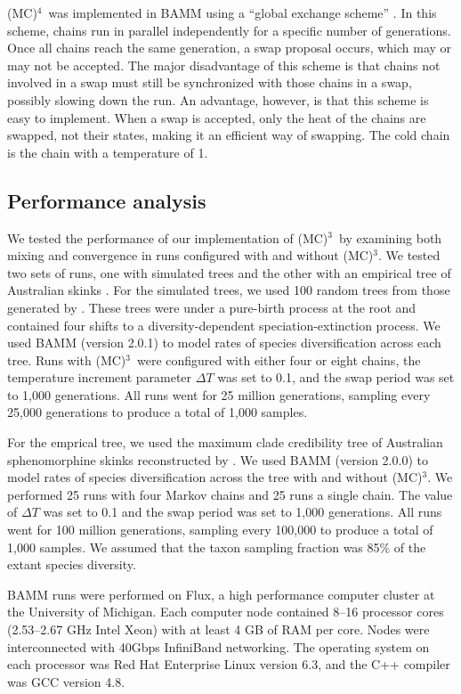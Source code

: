 \documentclass[12pt]{article}
\newcommand{\MCMCMC}{(MC)$^{3}$}
\newcommand{\MCMCMCMC}{(MC)$^{4}$}
\begin{document}
\MCMCMCMC\ was implemented in BAMM
using a ``global exchange scheme'' \citep{alt04}.
%
In this scheme, chains run in parallel independently
for a specific number of generations.
%
Once all chains reach the same generation, a swap proposal occurs,
which may or may not be accepted.
%
The major disadvantage of this scheme
is that chains not involved in a swap
must still be synchronized with those chains in a swap,
possibly slowing down the run.
%
An advantage, however, is that this scheme is easy to implement.
%
When a swap is accepted, only the heat of the chains are swapped,
not their states, making it an efficient way of swapping.
%
The cold chain is the chain with a temperature of 1.


\subsection*{Performance analysis}

We tested the performance of our implementation of \MCMCMC\ 
by examining both mixing and convergence in runs
configured with and without \MCMCMC.
%
We tested two sets of runs, one with simulated trees
and the other with an empirical tree of Australian skinks \citep{rab14sysbio}.
%
For the simulated trees, we used 100 random trees
from those generated by \citet{rab14plos}.
%
These trees were under a pure-birth process at the root and
contained four shifts to a diversity-dependent speciation-extinction process.
%
We used BAMM (version 2.0.1) to model rates of species diversification
across each tree.
%
Runs with \MCMCMC\ were configured with either four or eight chains,
the temperature increment parameter $\Delta T$ was set to 0.1,
and the swap period was set to 1,000 generations.
%
All runs went for 25 million generations,
sampling every 25,000 generations to produce a total of 1,000 samples.


For the emprical tree, we used the maximum clade credibility tree
of Australian sphenomorphine skinks reconstructed by \citet{rab14sysbio}.
%
We used BAMM (version 2.0.0) to model rates of species diversification
across the tree with and without \MCMCMC.
%
We performed 25 runs with four Markov chains and 25 runs a single chain.
%
The value of $\Delta T$ was set to 0.1
and the swap period was set to 1,000 generations.
%
All runs went for 100 million generations,
sampling every 100,000 to produce a total of 1,000 samples.
%
We assumed that the taxon sampling fraction was 85\%
of the extant species diversity.


BAMM runs were performed on Flux,
a high performance computer cluster at the University of Michigan.
%
Each computer node contained 8--16 processor cores
(2.53--2.67 GHz Intel Xeon) with at least 4 GB of RAM per core.
%
Nodes were interconnected with 40Gbps InfiniBand networking.
%
The operating system on each processor
was Red Hat Enterprise Linux version 6.3,
and the C++ compiler was GCC version 4.8.
\end{document}
